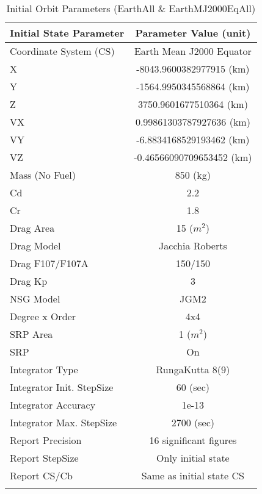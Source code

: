 \clearpage
\begin{table}[htp!]
\centering \caption{Initial Orbit Parameters (EarthAll \&
EarthMJ2000EqAll)}
      \begin{tabular}{lc}
      \hline\hline
            Initial State Parameter & Parameter Value (unit)\\
            \hline
            Coordinate System (CS) & Earth Mean J2000 Equator\\
            X & -8043.9600382977915 (km)\\
            Y & -1564.9950345568864 (km)\\
            Z & 3750.9601677510364 (km)\\
            VX & 0.99861303787927636 (km)\\
            VY & -6.8834168529193462 (km)\\
            VZ & -0.46566090709653452 (km)\\
            Mass (No Fuel) & 850 (kg)\\
            Cd & 2.2\\
            Cr & 1.8\\
            Drag Area & 15 ($m^2$)\\
            Drag Model & Jacchia Roberts\\
            Drag F107/F107A & 150/150\\
            Drag Kp & 3\\
            NSG Model & JGM2\\
            Degree x Order & 4x4\\
            SRP Area & 1 ($m^2$)\\
            SRP & On\\
            Integrator Type & RungaKutta 8(9)\\
            Integrator Init. StepSize & 60 (sec)\\
            Integrator Accuracy & 1e-13\\
            Integrator Max. StepSize & 2700 (sec)\\
            Report Precision & 16 significant figures\\
            Report StepSize & Only initial state\\
            Report CS/Cb & Same as initial state CS\\
      \hline\hline
      \label{Table: InitStopCondStateAll}
\end{tabular}
\end{table}


